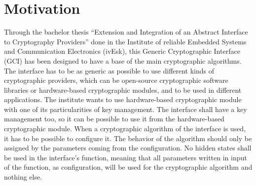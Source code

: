 \chapter{Motivation}

Through the bachelor thesis ``Extension and Integration of an Abstract
Interface to Cryptography Providers'' done in the Institute of reliable Embedded
Systems and Communication Electronics (ivEsk), this Generic Cryptographic
Interface (GCI) has been designed to have a base of the main cryptographic
algorithms. The interface has to be as generic as possible to use different kinds of cryptographic
providers, which can be open-source cryptographic software
libraries or hardware-based cryptographic modules, and to
be used in different applications.
The institute wants to use hardware-based cryptographic module with one of its particularities of
key management. The interface shall have a key management too, so it can be possible to use it from
the hardware-based cryptographic module. When a cryptographic algorithm of the interface is used,
it has to be possible to configure it. The behavior of the algorithm should only be assigned by the
parameters coming from the configuration. No hidden states shall be used in the
interface's function, meaning that all parameters written in input of the function, as configuration, will be used for the
cryptographic algorithm and nothing else.
